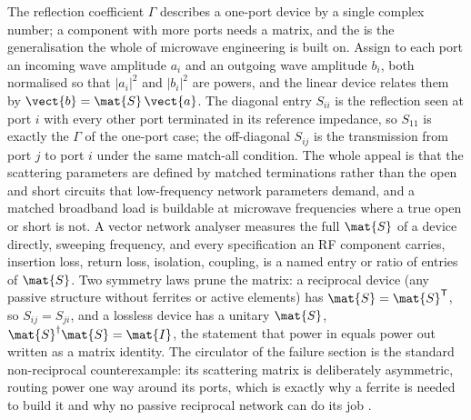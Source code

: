 \begin{mastery}
The reflection coefficient $\Gamma$ describes a one-port device by a single
complex number; a component with more ports needs a matrix, and the
 is the generalisation the whole of microwave
engineering is built on. Assign to each port an incoming wave amplitude
$a_i$ and an outgoing wave amplitude $b_i$, both normalised so that
$|a_i|^2$ and $|b_i|^2$ are powers, and the linear device relates them by
$\vect{b} = \mat{S}\,\vect{a}$. The diagonal entry $S_{ii}$ is the
reflection seen at port $i$ with every other port terminated in its
reference impedance, so $S_{11}$ is exactly the $\Gamma$ of the one-port
case; the off-diagonal $S_{ij}$ is the transmission from port $j$ to port
$i$ under the same match-all condition. The whole appeal is that the
scattering parameters are defined by matched terminations rather than the
open and short circuits that low-frequency network parameters demand, and a
matched broadband load is buildable at microwave frequencies where a true
open or short is not. A vector network analyser measures the full $\mat{S}$
of a device directly, sweeping frequency, and every specification an RF
component carries, insertion loss, return loss, isolation, coupling, is a
named entry or ratio of entries of $\mat{S}$. Two symmetry laws prune the
matrix: a reciprocal device (any passive structure without ferrites or
active elements) has $\mat{S} = \mat{S}^{\mathsf{T}}$, so $S_{ij} =
S_{ji}$, and a lossless device has a unitary $\mat{S}$, $\mat{S}^{\dagger}
\mat{S} = \mat{I}$, the statement that power in equals power out written as
a matrix identity. The circulator of the failure section is the standard
non-reciprocal counterexample: its scattering matrix is deliberately
asymmetric, routing power one way around its ports, which is exactly why a
ferrite is needed to build it and why no passive reciprocal network can do
its job \cite{text:pozar-microwave}.
\end{mastery}

